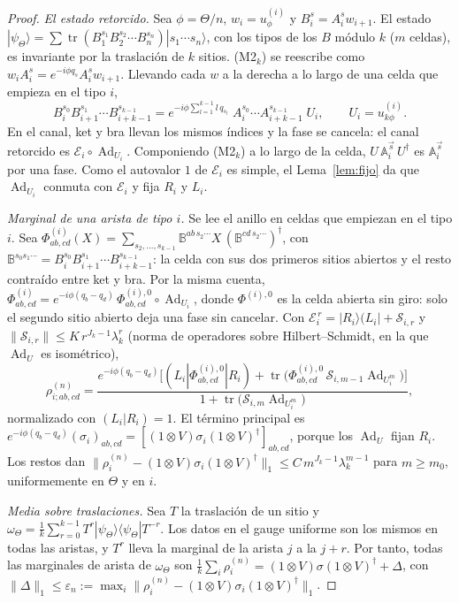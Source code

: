 \documentclass[11pt,a4paper]{article}
\theoremstyle{remark}
\newcommand{\tr}{\operatorname{tr}}
\newcommand{\Ad}{\operatorname{Ad}}
\newcommand{\ket}[1]{|#1\rangle}
\newcommand{\bra}[1]{\langle #1|}
\begin{document}
\begin{proof}
\emph{El estado retorcido.} Sea $\phi=\Theta/n$, $w_i=u^{(i)}_\phi$ y $B_i^s=A_i^sw_{i+1}$. El
estado $\ket{\psi_\Theta}=\sum\tr(B_1^{s_1}B_2^{s_2}\cdots B_n^{s_n})\ket{s_1\cdots s_n}$, con los
tipos de los $B$ módulo $k$ ($m$ celdas), es invariante por la traslación de $k$ sitios. (M2$_k$) se reescribe como
$w_iA_i^s=e^{-i\phi q_s}A_i^sw_{i+1}$. Llevando cada $w$ a la derecha a lo largo de una celda que
empieza en el tipo $i$,
\[
  B_i^{s_0}B_{i+1}^{s_1}\cdots B_{i+k-1}^{s_{k-1}}
  =e^{-i\phi\sum_{l=1}^{k-1}l\,q_{s_l}}\;A_i^{s_0}\cdots A_{i+k-1}^{s_{k-1}}\;U_i,\qquad U_i=u^{(i)}_{k\phi}.
\]
En el canal, ket y bra llevan los mismos índices y la fase se cancela: el canal retorcido es
$\mathcal E_i\circ\Ad_{U_i}$. Componiendo (M2$_k$) a lo largo de la celda,
$U\,\mathbb A_i^{\vec s}\,U^\dagger$ es $\mathbb A_i^{\vec s}$ por una fase. Como el autovalor $1$ de
$\mathcal E_i$ es simple, el Lema~\ref{lem:fijo} da que $\Ad_{U_i}$ conmuta con $\mathcal E_i$ y fija
$R_i$ y $L_i$.

\emph{Marginal de una arista de tipo $i$.} Se lee el anillo en celdas que empiezan en el tipo $i$.
Sea $\Phi^{(i)}_{ab,cd}(X)=\sum_{s_2,\dots,s_{k-1}}\mathbb B^{ab\,s_2\cdots}X\,(\mathbb B^{cd\,s_2\cdots})^\dagger$,
con $\mathbb B^{s_0s_1\cdots}=B_i^{s_0}B_{i+1}^{s_1}\cdots B_{i+k-1}^{s_{k-1}}$: la celda con sus
dos primeros sitios abiertos y el resto contraído entre ket y bra. Por la misma cuenta, $\Phi^{(i)}_{ab,cd}=e^{-i\phi(q_b-q_d)}\,\Phi^{(i),0}_{ab,cd}\circ\Ad_{U_i}$,
donde $\Phi^{(i),0}$ es la celda abierta sin giro: solo el segundo sitio abierto deja una fase
sin cancelar. Con $\mathcal E_i^{\,r}=\ket{R_i}(L_i|+\mathcal S_{i,r}$ y
$\|\mathcal S_{i,r}\|\le K\,r^{J_k-1}\lambda_k^r$ (norma de operadores sobre Hilbert--Schmidt, en la que $\Ad_U$
es isométrico),
\[
  \rho^{(n)}_{i;ab,cd}=\frac{e^{-i\phi(q_b-q_d)}\Big[(L_i|\Phi^{(i),0}_{ab,cd}|R_i)+\tr\big(\Phi^{(i),0}_{ab,cd}\,
  \mathcal S_{i,m-1}\Ad_{U_i^m}\big)\Big]}{1+\tr\big(\mathcal S_{i,m}\Ad_{U_i^m}\big)},
\]
normalizado con $(L_i|R_i)=1$. El término principal es $e^{-i\phi(q_b-q_d)}(\sigma_i)_{ab,cd}=
[(1\otimes V)\sigma_i(1\otimes V)^\dagger]_{ab,cd}$, porque los $\Ad_U$ fijan $R_i$. Los restos dan
$\|\rho^{(n)}_i-(1\otimes V)\sigma_i(1\otimes V)^\dagger\|_1\le C\,m^{J_k-1}\lambda_k^{m-1}$ para $m\ge m_0$,
uniformemente en $\Theta$ y en $i$.

\emph{Media sobre traslaciones.} Sea $T$ la traslación de un sitio y
$\omega_\Theta=\tfrac1k\sum_{r=0}^{k-1}T^r\ket{\psi_\Theta}\bra{\psi_\Theta}T^{-r}$. Los datos en
el gauge uniforme son los mismos en todas las aristas, y $T^r$ lleva la marginal de la arista $j$
a la $j+r$. Por tanto, todas las marginales de arista de $\omega_\Theta$ son
$\tfrac1k\sum_i\rho^{(n)}_i=(1\otimes V)\sigma(1\otimes V)^\dagger+\Delta$, con $\|\Delta\|_1\le\varepsilon_n
:=\max_i\|\rho^{(n)}_i-(1\otimes V)\sigma_i(1\otimes V)^\dagger\|_1$.


\end{proof}
\end{document}
